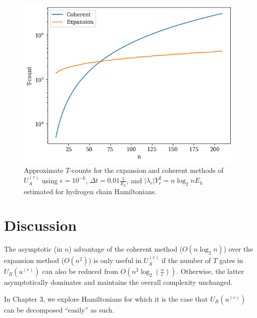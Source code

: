 \begin{figure}[h]
    \centering
    \includegraphics{Tcount.png}
    \caption{Approximate $T$-counts for the expansion and coherent methods of $U_A^{(r)}$ using $\epsilon = 10^{-6}$, $\Delta t = 0.01 \frac{1}{E_h}$, and $|\lambda_r|Y_r^2 = n\log_2{n} E_h$ estimated for hydrogen chain Hamiltonians.}
    \label{fig: Tcounts}
\end{figure}



\section{Discussion}

The asymptotic (in $n$) advantage of the coherent method ($O(n\log_2{n})$) over the expansion method ($O(n^2)$) is only useful in $U_A^{(r)}$ if the number of $T$ gates in $U_R(u^{(r)})$ can also be reduced from $O(n^2\log_2(\frac{n}{\epsilon}))$. Otherwise, the latter asymptotically dominates and maintains the overall complexity unchanged.

In Chapter 3, we explore Hamiltonians for which it is the case that $U_R(u^{(r)})$ can be decomposed ``easily'' as such.



